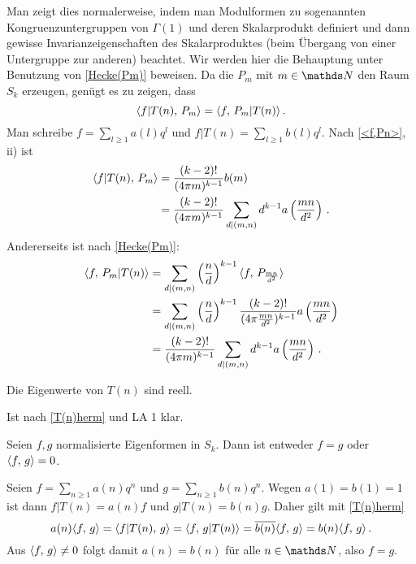 \begin{bewe}
Man zeigt dies normalerweise, indem man Modulformen zu sogenannten Kongruenzuntergruppen von $\Gamma(1)$ und deren Skalarprodukt definiert und dann gewisse Invarianzeigenschaften des Skalarproduktes (beim Übergang von einer Untergruppe zur anderen) beachtet. Wir werden hier die Behauptung unter Benutzung von \autoref{Hecke(Pm)} beweisen. Da die $P_m$ mit $m \in \NN$ den Raum $S_k$ erzeugen, genügt es zu zeigen, dass
\[
	\scalarprd {f|T(n)}{P_m} = \scalarprd f{P_m|T(n)}
	\,.
\]
Man schreibe $f = \sum_{l \geq 1} a(l) q^l$ und $f | T(n) = \sum_{l \geq 1} b(l) q^l$. Nach \autoref{<f,Pn>}, ii) ist
\begin{align*}
	\scalarprd {f|T(n)}{P_m} &= \frac {(k-2)!}{(4\pi m)^{k-1}} b(m) \\
	&= \frac {(k-2)!}{(4\pi m)^{k-1}} \sum_{d|(m,n)} d^{k-1} a\left( \frac {mn}{d^2} \right)
	\,.
\end{align*}
Andererseits ist nach \autoref{Hecke(Pm)}:
\begin{align*}
	\scalarprd f{P_m|T(n)} &= \sum_{d|(m,n)} \left( \frac nd \right)^{k-1} \scalarprd f{P_{\frac {mn}{d^2}}} \\
	&= \sum_{d|(m,n)} \left( \frac nd \right)^{k-1} \frac {(k-2)!}{(4\pi \frac {mn}{d^2})^{k-1}} a\left( \frac {mn}{d^2} \right) \\
	&= \frac {(k-2)!}{(4\pi m)^{k-1}} \sum_{d|(m,n)} d^{k-1} a\left( \frac {mn}{d^2} \right)
	\,.
\end{align*}
\end{bewe}

\begin{koro}
Die Eigenwerte von $T(n)$ sind reell.
\end{koro}
\begin{bewe}
Ist nach \autoref{T(n)herm} und LA 1 klar.
\end{bewe}

\begin{koro}\label{normEigfkt:id/orth}
Seien $f, g$ normalisierte Eigenformen in $S_k$. Dann ist entweder $f = g$ oder $\scalarprd fg = 0$.
\end{koro}

\begin{bewe}
Seien $f = \sum_{n \geq 1} a(n) q^n$ und $g = \sum_{n \geq 1} b(n) q^n$. Wegen $a(1) = b(1) = 1$ ist dann $f | T(n) = a(n) f$ und $g | T(n) = b(n) g$. Daher gilt mit \autoref{T(n)herm}
\[
	a(n) \scalarprd fg = \scalarprd {f|T(n)}g = \scalarprd f{g|T(n)} = \conj{b(n)} \scalarprd fg = b(n) \scalarprd fg
	\,.
\]
Aus $\scalarprd fg \neq 0$ folgt damit $a(n) = b(n)$ für alle $n \in \NN$, also $f = g$.
\end{bewe}

